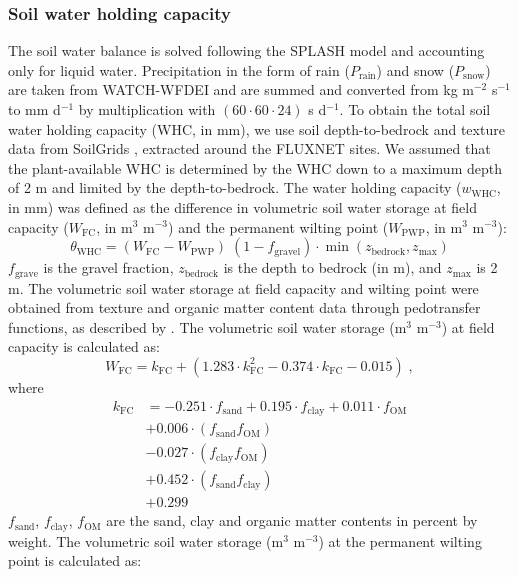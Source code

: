 \documentclass{myreport}
\begin{document}
\subsubsection{Soil water holding capacity}
\label{sec:whc}
The soil water balance is solved following the SPLASH model and accounting only for liquid water. Precipitation in the form of rain ($P_{\text{rain}}$) and snow ($P_{\text{snow}}$) are taken from WATCH-WFDEI \citep{Weedon2014-nv} and are summed and converted from kg m$^{-2}$ s$^{-1}$ to mm d$^{-1}$ by multiplication with $(60 \cdot 60 \cdot 24)$ s d$^{-1}$. To obtain the total soil water holding capacity (WHC, in mm), we use soil depth-to-bedrock and texture data from SoilGrids \citep{Hengl2014-jm}, extracted around the FLUXNET sites. We assumed that the plant-available WHC is determined by the WHC down to a maximum depth of 2 m and limited by the depth-to-bedrock. The water holding capacity ($w_\text{WHC}$, in mm) was defined as the difference in volumetric soil water storage at field capacity ($W_{\text{FC}}$, in m$^3$ m$^{-3}$) and the permanent wilting point ($W_{\text{PWP}}$, in m$^3$ m$^{-3}$):
\begin{equation}
\theta_\text{WHC} = (W_{\text{FC}} - W_{\text{PWP}}) \; (1-f_\text{gravel})\cdot \min(z_\text{bedrock}, z_\text{max})
\end{equation}
$f_\text{grave}$ is the gravel fraction, $z_\text{bedrock}$ is the depth to bedrock (in m), and $z_\text{max}$ is 2 m. The volumetric soil water storage at field capacity and wilting point were obtained from texture and organic matter content data through pedotransfer functions, as described by \cite{saxton06}. The volumetric soil water storage (m$^3$ m$^{-3}$) at field capacity is calculated as:
\begin{equation}
W_{\text{FC}}= k_\text{FC}+(1.283\cdot k_\text{FC}^{2}-0.374\cdot k_\text{FC}-0.015)\;, 
\end{equation}
where
\begin{align}
k_\text{FC} &=-0.251\cdot f_{\text{sand}} + 0.195\cdot f_{\text{clay}} + 0.011\cdot f_{\text{OM}}\\                            
&+ 0.006\cdot (f_{\text{sand}} f_{\text{OM}})\\
&- 0.027\cdot (f_{\text{clay}} f_{\text{OM}})\\
&+ 0.452\cdot (f_{\text{sand}} f_{\text{clay}})\\
&+ 0.299
\end{align}
$f_{\text{sand}}$, $f_{\text{clay}}$, $f_{\text{OM}}$ are the sand, clay and organic matter contents in percent by weight. The volumetric soil water storage (m$^3$ m$^{-3}$) at the permanent wilting point is calculated as:
\end{document}
